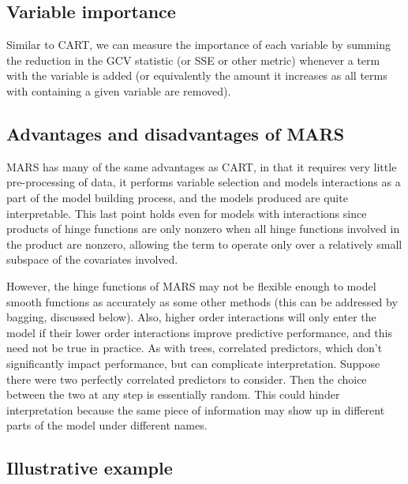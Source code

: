 \documentclass[12pt]{article}
\begin{document}

\subsection{Variable importance} %
\label{sub:variable_importance}

Similar to CART, we can measure the importance of each variable by summing the reduction in the GCV statistic (or SSE or other metric) whenever a term with the variable is added (or equivalently the amount it increases as all terms with containing a given variable are removed).


\subsection{Advantages and disadvantages of MARS} %
\label{sub:advantages_of_mars}

MARS has many of the same advantages as CART, in that it requires very little pre-processing of data, it performs variable selection and models interactions as a part of the model building process, and the models produced are quite interpretable. This last point holds even for models with interactions since products of hinge functions are only nonzero when all hinge functions involved in the product are nonzero, allowing the term to operate only over a relatively small subspace of the covariates involved.

However, the hinge functions of MARS may not be flexible enough to model smooth functions as accurately as some other methods (this can be addressed by bagging, discussed below). Also, higher order interactions will only enter the model if their lower order interactions improve predictive performance, and this need not be true in practice. As with trees, correlated predictors, which don't significantly impact performance, but can complicate interpretation. Suppose there were two perfectly correlated predictors to consider. Then the choice between the two at any step is essentially random. This could hinder interpretation because the same piece of information may show up in different parts of the model under different names.


\subsection{Illustrative example} %
\label{sub:mars-ex}
\end{document}
